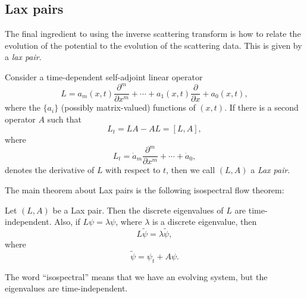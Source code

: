 \documentclass[a4paper]{article}
\begin{document}
\subsection{Lax pairs}
The final ingredient to using the inverse scattering transform is how to relate the evolution of the potential to the evolution of the scattering data. This is given by a \emph{lax pair}.

\begin{defi}
  Consider a time-dependent self-adjoint linear operator
  \[
    L = a_m (x, t) \frac{\partial^m}{\partial x^m} + \cdots + a_1 (x, t) \frac{\partial}{\partial x} + a_0(x, t),
  \]
  where the $\{a_i\}$ (possibly matrix-valued) functions of $(x, t)$. If there is a second operator $A$ such that
  \[
    L_t = LA - AL = [L, A],
  \]
  where
  \[
    L_t = \dot{a}_m \frac{\partial^m}{\partial x^m} + \cdots + \dot{a}_0,
  \]
  denotes the derivative of $L$ with respect to $t$, then we call $(L, A)$ a \emph{Lax pair}.
\end{defi}

The main theorem about Lax pairs is the following isospectral flow theorem:
\begin{thm}
  Let $(L, A)$ be a Lax pair. Then the discrete eigenvalues of $L$ are time-independent. Also, if $L\psi = \lambda \psi$, where $\lambda$ is a discrete eigenvalue, then
  \[
    L \tilde{\psi} = \lambda \tilde{\psi},
  \]
  where
  \[
    \tilde{\psi} = \psi_t + A \psi.
  \]
\end{thm}
The word ``isospectral'' means that we have an evolving system, but the eigenvalues are time-independent.
\end{document}
